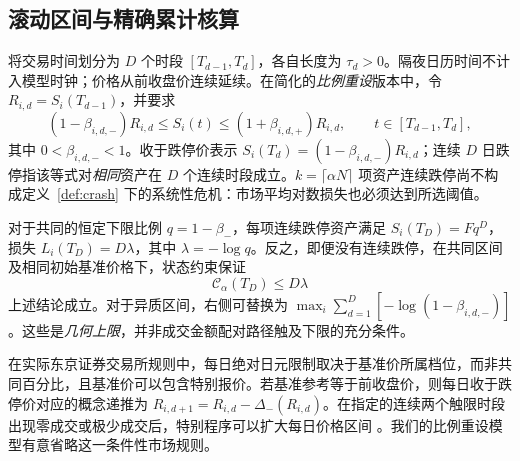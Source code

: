 \documentclass[11pt]{article}
\numberwithin{equation}{section}
\theoremstyle{definition}
\theoremstyle{remark}
\newcommand{\Cris}{\mathcal{C}}
\begin{document}
\subsection{滚动区间与精确累计核算}\label{subsec:multiday-protocol}
将交易时间划分为 $D$ 个时段 $[T_{d-1},T_d]$，各自长度为 $\tau_d>0$。隔夜日历时间不计入模型时钟；价格从前收盘价连续延续。在简化的\emph{比例重设}版本中，令 $R_{i,d}=S_i(T_{d-1})$，并要求
\begin{equation}\label{eq:rolling-band}
 (1-\beta_{i,d,-})R_{i,d}\le S_i(t)\le(1+\beta_{i,d,+})R_{i,d},
 \qquad t\in[T_{d-1},T_d],
\end{equation}
其中 $0<\beta_{i,d,-}<1$。收于跌停价表示
$S_i(T_d)=(1-\beta_{i,d,-})R_{i,d}$；连续 $D$ 日跌停指该等式对\emph{相同}资产在 $D$ 个连续时段成立。$k=\lceil\alpha N\rceil$ 项资产连续跌停尚不构成定义~\ref{def:crash} 下的系统性危机：市场平均对数损失也必须达到所选阈值。

对于共同的恒定下限比例 $q=1-\beta_-$，每项连续跌停资产满足
$S_i(T_D)=Fq^D$，损失 $L_i(T_D)=D\lambda$，其中 $\lambda=-\log q$。反之，即便没有连续跌停，在共同区间及相同初始基准价格下，状态约束保证
\begin{equation}\label{eq:rolling-cumulative-upper}
  \Cris_\alpha(T_D)\le D\lambda
\end{equation}
上述结论成立。对于异质区间，右侧可替换为
$\max_i\sum_{d=1}^D[-\log(1-\beta_{i,d,-})]$。这些是\emph{几何上限}，并非成交金额配对路径触及下限的充分条件。

在实际东京证券交易所规则中，每日绝对日元限制取决于基准价所属档位，而非共同百分比，且基准价可以包含特别报价。若基准参考等于前收盘价，则每日收于跌停价对应的概念递推为 $R_{i,d+1}=R_{i,d}-\Delta_-(R_{i,d})$。在指定的连续两个触限时段出现零成交或极少成交后，特别程序可以扩大每日价格区间 \citep{JPX2026}。我们的比例重设模型有意省略这一条件性市场规则。
\end{document}
